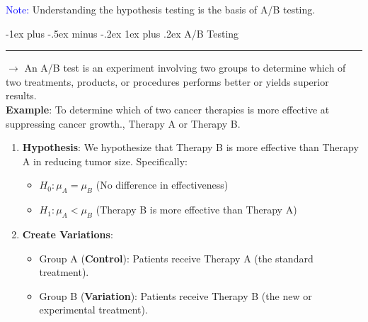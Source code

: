 \documentclass[letterpaper, 10.5pt,landscape]{article}
\makeatletter
\renewcommand{\subsubsection}{\@startsection{subsubsection}{3}{0mm}%
                                {-1ex plus -.5ex minus -.2ex}%
                                {1ex plus .2ex}%
                                {\normalfont\small\bfseries}}
\makeatother
\begin{document}
\begin{multicols*}{3}













\textcolor{blue}{Note:} Understanding the hypothesis testing is the basis of A/B testing.

\subsubsection{A/B Testing} {\color{teal}\hrule height 0.5pt} \smallskip
$\rightarrow$ An A/B test is an experiment involving two groups to determine which of two treatments, products, or procedures performs better or yields superior results.\\

\textbf{Example}: To determine which of two cancer therapies is more effective at suppressing cancer growth., Therapy A or Therapy B. 

\begin{enumerate}
    \item \textbf{Hypothesis}: We hypothesize that Therapy B is more effective than Therapy A in reducing tumor size. Specifically:
    \vspace{-2pt}
    \begin{itemize}
    \vspace{-2pt}
        \item \(\boxed{H_0: \mu_A = \mu_B} \) (No difference in effectiveness)
        \vspace{-2pt}
        \item \( \boxed{ H_1: \mu_A  < \mu_B}\) (Therapy B is more effective than Therapy A)
        \vspace{-2pt}
    \end{itemize}
    
    \item \textbf{Create Variations}:
    \vspace{-2pt}
    \begin{itemize}
    \vspace{-2pt}
        \item Group A (\textbf{Control}): Patients receive Therapy A (the standard treatment).
        \vspace{-2pt}
        \item Group B (\textbf{Variation}): Patients receive Therapy B (the new or experimental treatment).
        \vspace{-2pt}
    \end{itemize}


\end{enumerate}
\end{multicols*}
\end{document}
